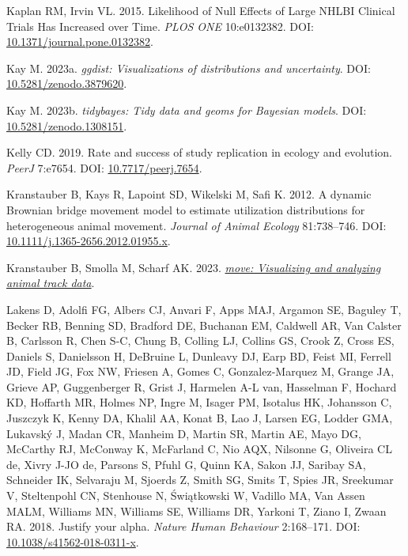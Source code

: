 \documentclass[10pt,a4paper]{article}
\newlength{\cslhangindent}
\newlength{\cslentryspacingunit} %
\newenvironment{CSLReferences}[2] %
 {%
  \setlength{\parindent}{0pt}
  \ifodd #1
  \let\oldpar\par
  \def\par{\hangindent=\cslhangindent\oldpar}
  \fi
  \setlength{\parskip}{#2\cslentryspacingunit}
 }%
 {}
\begin{document}
\begin{CSLReferences}{1}{0}
\leavevmode{}%
Kaplan RM, Irvin VL. 2015. Likelihood of {Null} {Effects} of {Large} {NHLBI} {Clinical} {Trials} {Has} {Increased} over {Time}. \emph{PLOS ONE} 10:e0132382. DOI: \href{https://doi.org/10.1371/journal.pone.0132382}{10.1371/journal.pone.0132382}.

\leavevmode{}%
Kay M. 2023a. \emph{{ggdist}: Visualizations of distributions and uncertainty}. DOI: \href{https://doi.org/10.5281/zenodo.3879620}{10.5281/zenodo.3879620}.

\leavevmode{}%
Kay M. 2023b. \emph{{tidybayes}: Tidy data and geoms for {Bayesian} models}. DOI: \href{https://doi.org/10.5281/zenodo.1308151}{10.5281/zenodo.1308151}.

\leavevmode{}%
Kelly CD. 2019. Rate and success of study replication in ecology and evolution. \emph{PeerJ} 7:e7654. DOI: \href{https://doi.org/10.7717/peerj.7654}{10.7717/peerj.7654}.

\leavevmode{}%
Kranstauber B, Kays R, Lapoint SD, Wikelski M, Safi K. 2012. A dynamic {Brownian} bridge movement model to estimate utilization distributions for heterogeneous animal movement. \emph{Journal of Animal Ecology} 81:738--746. DOI: \href{https://doi.org/10.1111/j.1365-2656.2012.01955.x}{10.1111/j.1365-2656.2012.01955.x}.

\leavevmode{}%
Kranstauber B, Smolla M, Scharf AK. 2023. \emph{\href{https://CRAN.R-project.org/package=move}{{move}: Visualizing and analyzing animal track data}}.

\leavevmode{}%
Lakens D, Adolfi FG, Albers CJ, Anvari F, Apps MAJ, Argamon SE, Baguley T, Becker RB, Benning SD, Bradford DE, Buchanan EM, Caldwell AR, Van Calster B, Carlsson R, Chen S-C, Chung B, Colling LJ, Collins GS, Crook Z, Cross ES, Daniels S, Danielsson H, DeBruine L, Dunleavy DJ, Earp BD, Feist MI, Ferrell JD, Field JG, Fox NW, Friesen A, Gomes C, Gonzalez-Marquez M, Grange JA, Grieve AP, Guggenberger R, Grist J, Harmelen A-L van, Hasselman F, Hochard KD, Hoffarth MR, Holmes NP, Ingre M, Isager PM, Isotalus HK, Johansson C, Juszczyk K, Kenny DA, Khalil AA, Konat B, Lao J, Larsen EG, Lodder GMA, Lukavský J, Madan CR, Manheim D, Martin SR, Martin AE, Mayo DG, McCarthy RJ, McConway K, McFarland C, Nio AQX, Nilsonne G, Oliveira CL de, Xivry J-JO de, Parsons S, Pfuhl G, Quinn KA, Sakon JJ, Saribay SA, Schneider IK, Selvaraju M, Sjoerds Z, Smith SG, Smits T, Spies JR, Sreekumar V, Steltenpohl CN, Stenhouse N, Świątkowski W, Vadillo MA, Van Assen MALM, Williams MN, Williams SE, Williams DR, Yarkoni T, Ziano I, Zwaan RA. 2018. Justify your alpha. \emph{Nature Human Behaviour} 2:168--171. DOI: \href{https://doi.org/10.1038/s41562-018-0311-x}{10.1038/s41562-018-0311-x}.


\end{CSLReferences}
\end{document}
